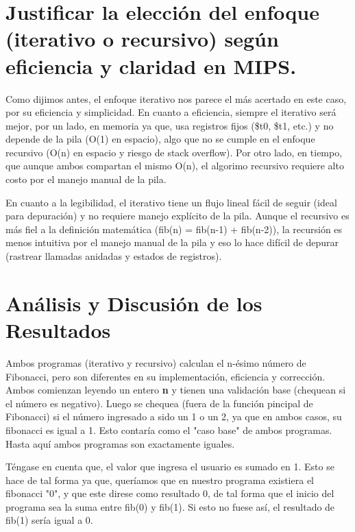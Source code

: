 \documentclass{article}
\begin{document}
\section{Justificar la elección del enfoque (iterativo o recursivo) según eficiencia y claridad en MIPS.}

Como dijimos antes, el enfoque iterativo nos parece el más acertado en este caso, por su eficiencia y simplicidad. En cuanto a eficiencia, siempre el iterativo será mejor, por un lado, en memoria ya que, usa registros fijos (\$t0, \$t1, etc.) y no depende de la pila (O(1) en espacio), algo que no se cumple en el enfoque recursivo (O(n) en espacio y riesgo de  stack overflow). Por otro lado, en tiempo, que aunque ambos compartan el mismo O(n), el algorimo recursivo requiere alto costo por el manejo manual de la pila. \newline

En cuanto a la legibilidad, el iterativo tiene un flujo lineal fácil de seguir (ideal para depuración) y no requiere manejo explícito de la pila. Aunque el recursivo es más fiel a la definición matemática (fib(n) = fib(n-1) + fib(n-2)),  la recursión es menos intuitiva por el manejo manual de la pila y eso lo hace difícil de depurar (rastrear llamadas anidadas y estados de registros).

\section{Análisis y Discusión de los Resultados}

Ambos programas (iterativo y recursivo) calculan el n-ésimo número de Fibonacci, pero son diferentes en su implementación, eficiencia y corrección. Ambos comienzan leyendo un entero \textbf{n} y tienen una validación base (chequean si el número es negativo). Luego se chequea (fuera de la función pincipal de Fibonacci) si el número ingresado a sido un 1 o un 2, ya que en ambos casos, su fibonacci es igual a 1. Esto contaría como el "caso base" de ambos programas. Hasta aquí ambos programas son exactamente iguales.\newline

Téngase en cuenta que, el valor que ingresa el usuario es sumado en 1. Esto se hace de tal forma ya que, queríamos que en nuestro programa existiera el fibonacci "0", y que este direse como resultado 0, de tal forma que el inicio del programa sea la suma entre fib(0) y fib(1). Si esto no fuese así, el resultado de fib(1) sería igual a 0.\newline
\end{document}
